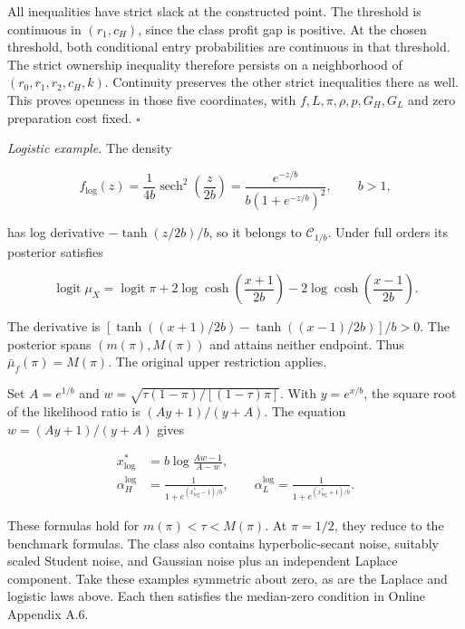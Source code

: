 All inequalities have strict slack at the constructed point.
The threshold is continuous in \((r_1,c_H)\), since the class profit gap is positive.
At the chosen threshold, both conditional entry probabilities are continuous in that threshold.
The strict ownership inequality therefore persists on a neighborhood of \((r_0,r_1,r_2,c_H,k)\).
Continuity preserves the other strict inequalities there as well.
This proves openness in those five coordinates, with \(f,L,\pi,\rho,p,G_H,G_L\) and zero preparation cost fixed.
\(\square\)

\emph{Logistic example.}
The density

\[
f_{\mathrm{log}}(z)=\frac{1}{4b}\operatorname{sech}^{2}\left(\frac z{2b}\right)
=\frac{e^{-z/b}}{b(1+e^{-z/b})^2},\qquad b>1,
\tag{A.21}\label{eq:paper-a-21}
\]

has log derivative \(-\tanh(z/2b)/b\), so it belongs to \(\mathcal C_{1/b}\).
Under full orders its posterior satisfies

\[
\operatorname{logit}\mu_X
=\operatorname{logit}\pi
+2\log\cosh\left(\frac{x+1}{2b}\right)
-2\log\cosh\left(\frac{x-1}{2b}\right).
\tag{A.22}\label{eq:paper-a-22}
\]

The derivative is
\([\tanh((x+1)/2b)-\tanh((x-1)/2b)]/b>0\).
The posterior spans \((m(\pi),M(\pi))\) and attains neither endpoint.
Thus \(\bar\mu_f(\pi)=M(\pi)\).
The original upper restriction applies.
\par
Set \(A=e^{1/b}\) and
\(w=\sqrt{\tau(1-\pi)/[(1-\tau)\pi]}\).
With \(y=e^{x/b}\), the square root of the likelihood ratio is
\((Ay+1)/(y+A)\).
The equation \(w=(Ay+1)/(y+A)\) gives

\[
\begin{aligned}
x^*_{\mathrm{log}}&=b\log\frac{Aw-1}{A-w},\\
\alpha_H^{\mathrm{log}}&=\frac1{1+e^{(x^*_{\mathrm{log}}-1)/b}},\qquad
\alpha_L^{\mathrm{log}}=\frac1{1+e^{(x^*_{\mathrm{log}}+1)/b}}.
\end{aligned}
\tag{A.23}\label{eq:paper-a-23}
\]

These formulas hold for \(m(\pi)<\tau<M(\pi)\).
At \(\pi=1/2\), they reduce to the benchmark formulas.
The class also contains hyperbolic-secant noise, suitably scaled Student noise, and Gaussian noise plus an independent Laplace component.
Take these examples symmetric about zero, as are the Laplace and logistic laws above.
Each then satisfies the median-zero condition in Online Appendix A.6.


